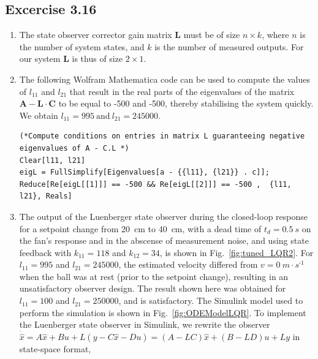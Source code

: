 \documentclass[10pt,twoside,openright]{article}
\begin{document}
\subsection*{Excercise 3.16}
\begin{enumerate}
	\setlength\itemsep{0em}
	\item The state observer corrector gain matrix $\bm{L}$ must be of size $n \times k$, where $n$ is the number of system states, and $k$ is the number of measured outputs. For our system $\bm{L}$ is thus of size $2 \times 1$.
	\item The following Wolfram Mathematica code can be used to compute the values of $l_{11}$ and $l_{21}$ that result in the real parts of the eigenvalues of the matrix $\bm{A} - \bm{L} \cdot \bm{C}$ to be equal to -500 and -500, thereby stabilising the system quickly. We obtain $l_{11} = 995~\text{and}~l_{21} = 245 000$.
	
\begin{lstlisting}[style=mathematica]
(*Compute conditions on entries in matrix L guaranteeing negative eigenvalues of A - C.L *)
Clear[l11, l21]
eigL = FullSimplify[Eigenvalues[a - {{l11}, {l21}} . c]];
Reduce[Re[eigL[[1]]] == -500 && Re[eigL[[2]]] == -500 ,  {l11, l21}, Reals]
\end{lstlisting}
	
	\item The output of the Luenberger state observer during the closed-loop response for a setpoint change from 20~cm to 40~cm, with a dead time of $t_d=0.5~s$ on the fan's response and in the abscense of measurement noise, and using state feedback with $k_{11} =118$ and $k_{12} =34$, is shown in Fig.~\ref{fig:tuned_LQR2}. For $l_{11} = 995$ and $l_{21}= 245000$, the estimated velocity differed from $v=0~m\cdot s^{\text{-}1}$ when the ball was at rest (prior to the setpoint change), resulting in an unsatisfactory observer design. The result shown here was obtained for $l_{11} = 100$ and $l_{21} = 250000$, and is satisfactory. The Simulink model used to perform the simulation is shown in Fig.~\ref{fig:ODEModelLQR}. To implement the Luenberger state observer in Simulink, we rewrite the observer $\dot{\hat{x}} = A \hat{x} + B u + L (y - C \hat{x} - D u) = (A-LC)\hat{x} + (B-LD)u + Ly$ in state-space format,


\end{enumerate}
\end{document}
